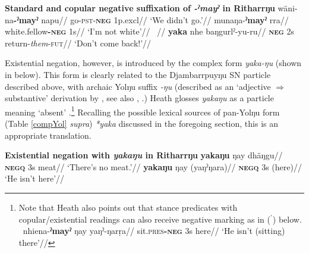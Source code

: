 {\pex\textbf{Standard and copular negative suffixation of {\em -ˀmayˀ} in Ritharrŋu}
\a\begingl\gla wäni-na\textbf{-ˀmayˀ} napu//
\glb go-\textsc{pst-\textbf{neg}} 1\gls{p}.\gls{excl}//
\glft `We didn't go.'//\endgl
\a\begingl\gla munaŋa-\textbf{ˀmayˀ} rra//
\glb white.fellow\textsc{\textbf{-neg}} 1s//
\glft`I'm not white'//\endgl\xe 
\pex~\label{ritproh}\begingl{}//
\gla \textbf{yaka} nhe baŋgurlˀ-yu-ru//
\glb \textsc{\textbf{neg}} 2\gls{s} return-\textit{them}-\textsc{fut}//
\glft`Don't come back!'//\endgl\xe

Existential negation, however, is introduced by the complex form \textit{yaka-ŋu} (shown in \nextx{} below). This form is clearly related to the Djambarrpuyŋu SN particle described above, with archaic Yolŋu suffix {\textit{-ŋu}} (described as an `adjective $\Rightarrow$ substantive' derivation by \citet[34]{Schebeck2001}, see also \citealt[174ff]{Wilkinson1991}, \citealt[24]{Heath1980}.) Heath glosses \textit{yakaŋu} as a particle meaning `absent' \citeyearpar[102]{Heath1980}.\footnote{Note that Heath also points out that stance predicates with copular/existential readings can also receive negative marking as in ($^\prime$) below. 
	\pex[exno=\ref{ritnegxb}′,numoffset=3em]~\begingl\gla nhiena-\textbf{ˀmayˀ} ŋay yaŋˀ-ŋarṛa//
	\glb sit\textsc{.pres\textbf{-neg}} 3\gls{s} here//
	\glft`He isn't (sitting) there'//\endgl \xe
}
Recalling the possible lexical sources of pan-Yolŋu form (Table \ref{compYol} \textit{supra}) \textit{*yaka} discussed in the foregoing section, this is an appropriate translation.

\pex\textbf{Existential negation with {\em yakaŋu} in Ritharrŋu}
\a\begingl\gla \textbf{yakaŋu} ŋay dhäŋgu//
\glb\textsc{\textbf{negq}} 3\gls{s} meat//
\glft`There's no meat.'//
\endgl
\a\label{ritnegxb}\begingl\gla \textbf{yakaŋu} ŋay (yaŋˀŋara)//
\glb \textsc{\textbf{negq}} 3\gls{s} (here)//
\glft`He isn't here'//\endgl
\xe

}
